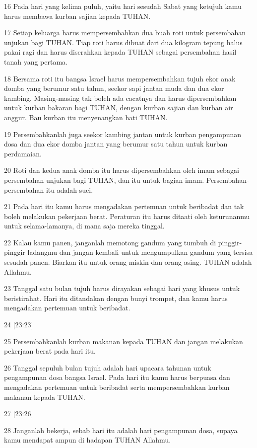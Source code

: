 \par 16 Pada hari yang kelima puluh, yaitu hari sesudah Sabat yang ketujuh kamu harus membawa kurban sajian kepada TUHAN.
\par 17 Setiap keluarga harus mempersembahkan dua buah roti untuk persembahan unjukan bagi TUHAN. Tiap roti harus dibuat dari dua kilogram tepung halus pakai ragi dan harus diserahkan kepada TUHAN sebagai persembahan hasil tanah yang pertama.
\par 18 Bersama roti itu bangsa Israel harus mempersembahkan tujuh ekor anak domba yang berumur satu tahun, seekor sapi jantan muda dan dua ekor kambing. Masing-masing tak boleh ada cacatnya dan harus dipersembahkan untuk kurban bakaran bagi TUHAN, dengan kurban sajian dan kurban air anggur. Bau kurban itu menyenangkan hati TUHAN.
\par 19 Persembahkanlah juga seekor kambing jantan untuk kurban pengampunan dosa dan dua ekor domba jantan yang berumur satu tahun untuk kurban perdamaian.
\par 20 Roti dan kedua anak domba itu harus dipersembahkan oleh imam sebagai persembahan unjukan bagi TUHAN, dan itu untuk bagian imam. Persembahan-persembahan itu adalah suci.
\par 21 Pada hari itu kamu harus mengadakan pertemuan untuk beribadat dan tak boleh melakukan pekerjaan berat. Peraturan itu harus ditaati oleh keturunanmu untuk selama-lamanya, di mana saja mereka tinggal.
\par 22 Kalau kamu panen, janganlah memotong gandum yang tumbuh di pinggir-pinggir ladangmu dan jangan kembali untuk mengumpulkan gandum yang tersisa sesudah panen. Biarkan itu untuk orang miskin dan orang asing. TUHAN adalah Allahmu.
\par 23 Tanggal satu bulan tujuh harus dirayakan sebagai hari yang khusus untuk beristirahat. Hari itu ditandakan dengan bunyi trompet, dan kamu harus mengadakan pertemuan untuk beribadat.
\par 24 [23:23]
\par 25 Persembahkanlah kurban makanan kepada TUHAN dan jangan melakukan pekerjaan berat pada hari itu.
\par 26 Tanggal sepuluh bulan tujuh adalah hari upacara tahunan untuk pengampunan dosa bangsa Israel. Pada hari itu kamu harus berpuasa dan mengadakan pertemuan untuk beribadat serta mempersembahkan kurban makanan kepada TUHAN.
\par 27 [23:26]
\par 28 Janganlah bekerja, sebab hari itu adalah hari pengampunan dosa, supaya kamu mendapat ampun di hadapan TUHAN Allahmu.
